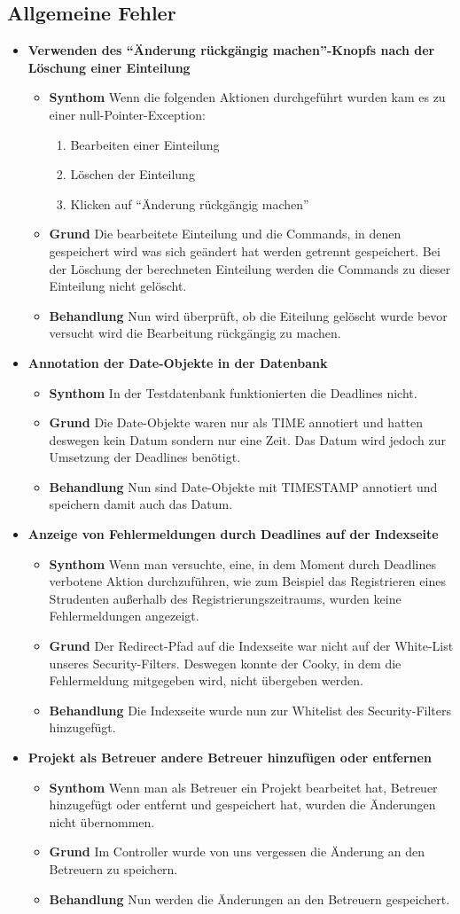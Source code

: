 \documentclass[parskip=full]{scrartcl}
\newcommand{\fehler}[4]{\textbf{#1}
 							\begin{itemize}
 							  \item \textbf{Synthom}  #2
 							  \item \textbf{Grund} #3
 							  \item \textbf{Behandlung} #4
 							\end{itemize}}
\newcommand{\code}[1]{{\ttfamily #1}}
\begin{document}
\subsection{Allgemeine Fehler}
\begin{itemize}
  \item \fehler{Verwenden des \enquote{Änderung rückgängig machen}-Knopfs nach
  der Löschung einer Einteilung }{Wenn die folgenden
  Aktionen durchgeführt wurden kam es zu einer \code{null}-Pointer-Exception:
\begin{enumerate}
  \item Bearbeiten einer Einteilung
  \item Löschen der Einteilung
  \item Klicken auf \enquote{Änderung rückgängig machen}
\end{enumerate}}{Die bearbeitete Einteilung und die Commands, in denen
gespeichert wird was sich geändert hat werden getrennt gespeichert. Bei der
Löschung der berechneten Einteilung werden die Commands zu dieser Einteilung
nicht gelöscht.}{Nun wird überprüft, ob die Eiteilung gelöscht wurde bevor
versucht wird die Bearbeitung rückgängig zu machen.}
\item \fehler{Annotation der Date-Objekte in der Datenbank }{In der %
Testdatenbank funktionierten die Deadlines nicht. }{Die Date-Objekte waren
nur als TIME annotiert und hatten deswegen kein Datum sondern nur eine Zeit.
Das Datum wird jedoch zur Umsetzung der Deadlines benötigt.}{Nun sind
Date-Objekte mit TIMESTAMP annotiert und speichern damit auch das Datum.}
\item \fehler{Anzeige von Fehlermeldungen durch Deadlines auf der
Indexseite}{Wenn man versuchte, eine, in dem Moment durch Deadlines verbotene
Aktion durchzuführen, wie zum Beispiel das Registrieren eines Strudenten
außerhalb des Registrierungszeitraums, wurden keine Fehlermeldungen
angezeigt.}{Der Redirect-Pfad auf die Indexseite war nicht auf der White-List
unseres Security-Filters. Deswegen konnte der Cooky, in dem die Fehlermeldung 
mitgegeben wird, nicht übergeben werden. }{Die Indexseite wurde nun zur
Whitelist des Security-Filters hinzugefügt.}
\item \fehler{Projekt als Betreuer andere Betreuer hinzufügen
oder entfernen}{Wenn man als Betreuer ein Projekt bearbeitet hat, Betreuer
hinzugefügt oder entfernt und gespeichert hat, wurden die Änderungen nicht übernommen.}{Im Controller
wurde von uns vergessen die Änderung an den Betreuern zu speichern.}{Nun werden die Änderungen an den Betreuern gespeichert.}

\end{itemize}
\end{document}
